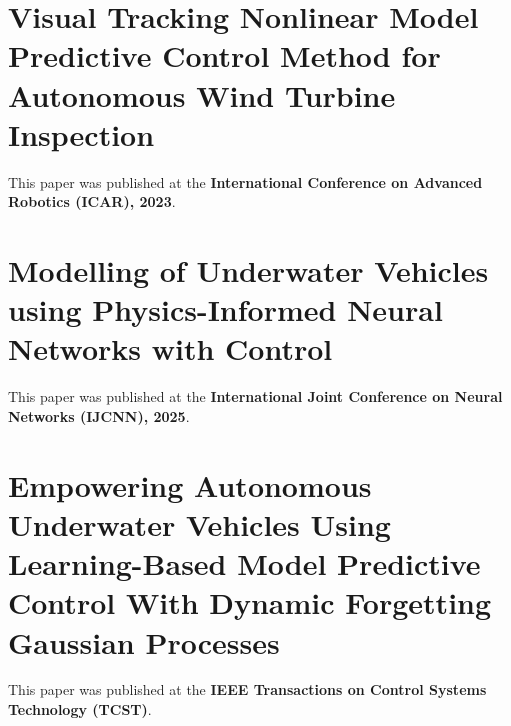 \documentclass[
10pt, %
b5paper, %
twoside, %
openright  %
]{book}  %
\begin{document}
\chapter{Visual Tracking Nonlinear Model Predictive Control Method for
Autonomous Wind Turbine Inspection}
\vspace{1cm}
This paper was published at the \textbf{International Conference on Advanced Robotics (ICAR), 2023}.


%



\chapter{Modelling of Underwater Vehicles using
Physics-Informed Neural Networks with Control}
\vspace{1cm}
This paper was published at the \textbf{International Joint Conference on Neural Networks (IJCNN), 2025}.





\chapter{Empowering Autonomous Underwater Vehicles Using Learning-Based Model Predictive Control With Dynamic Forgetting Gaussian Processes}
\vspace{1cm}
This paper was published at the \textbf{IEEE Transactions on Control Systems Technology (TCST)}.



\renewcommand\bibname{Bibliography}  %

\end{document}
